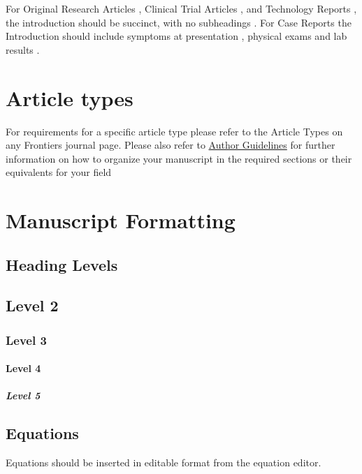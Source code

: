 \documentclass[utf8]{frontiersSCNS} %
\begin{document}
For Original Research Articles \citep{conference}, Clinical Trial Articles
\citep{article}, and Technology Reports \citep{patent}, the introduction should
be succinct, with no subheadings \citep{book}. For Case Reports the
Introduction should include symptoms at presentation \citep{chapter}, physical
exams and lab results \citep{dataset}.

\section{Article types}

For requirements for a specific article type please refer to the Article Types
on any Frontiers journal page. Please also refer to
\href{http://home.frontiersin.org/about/author-guidelines#Sections}{Author
Guidelines} for further information on how to organize your manuscript in the
required sections or their equivalents for your field


\section{Manuscript Formatting}

\subsection{Heading Levels}


\subsection{Level 2}
\subsubsection{Level 3}
\paragraph{Level 4}
\subparagraph{Level 5}

\subsection{Equations}
Equations should be inserted in editable format from the equation editor.
\end{document}
